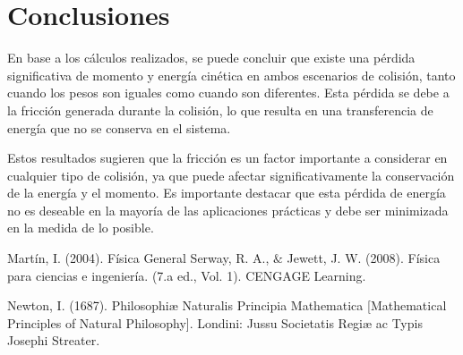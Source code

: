 \documentclass{article}
\begin{document}
\section{Conclusiones}\label{Conclusiones}				%

En base a los cálculos realizados, se puede concluir que existe una pérdida significativa de momento y energía cinética en ambos escenarios de colisión, tanto cuando los pesos son iguales como cuando son diferentes. Esta pérdida se debe a la fricción generada durante la colisión, lo que resulta en una transferencia de energía que no se conserva en el sistema.

Estos resultados sugieren que la fricción es un factor importante a considerar en cualquier tipo de colisión, ya que puede afectar significativamente la conservación de la energía y el momento. Es importante destacar que esta pérdida de energía no es deseable en la mayoría de las aplicaciones prácticas y debe ser minimizada en la medida de lo posible.
\begin{thebibliography}{9}						%
		Martín, I. (2004). Física General
		Serway, R. A., $\&$ Jewett, J. W. (2008). Física para ciencias e ingeniería. (7.a
ed., Vol. 1). CENGAGE Learning.

	Newton, I. (1687). Philosophiæ Naturalis Principia Mathematica [Mathematical Principles of Natural Philosophy]. Londini: Jussu Societatis Regiæ ac Typis Josephi Streater.
\end{thebibliography}
\end{document}
